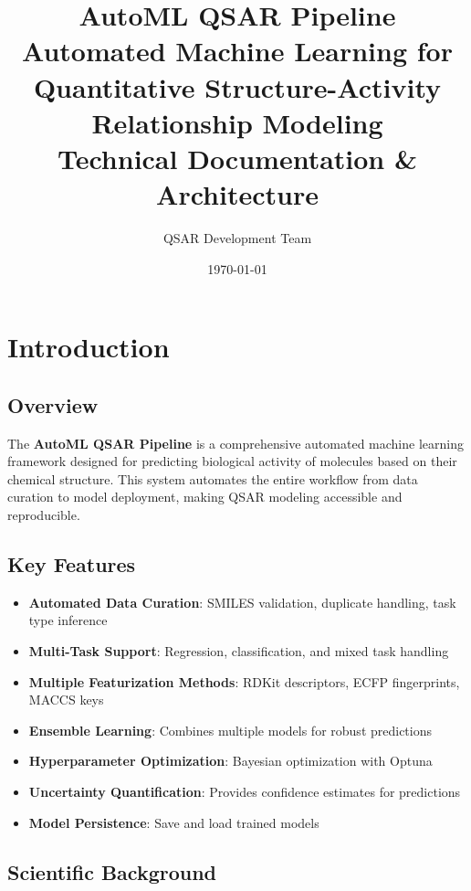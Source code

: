 \documentclass[11pt,a4paper]{article}
\title{
    \vspace{-2cm}
    \textbf{AutoML QSAR Pipeline}\\
    \large Automated Machine Learning for Quantitative Structure-Activity Relationship Modeling\\
    \vspace{0.5cm}
    \large Technical Documentation \& Architecture
}
\author{QSAR Development Team}
\date{\today}
\begin{document}
\maketitle
\tableofcontents
\newpage

\section{Introduction}

\subsection{Overview}

The \textbf{AutoML QSAR Pipeline} is a comprehensive automated machine learning framework designed for predicting biological activity of molecules based on their chemical structure. This system automates the entire workflow from data curation to model deployment, making QSAR modeling accessible and reproducible.

\subsection{Key Features}

\begin{itemize}[leftmargin=*]
    \item \textbf{Automated Data Curation}: SMILES validation, duplicate handling, task type inference
    \item \textbf{Multi-Task Support}: Regression, classification, and mixed task handling
    \item \textbf{Multiple Featurization Methods}: RDKit descriptors, ECFP fingerprints, MACCS keys
    \item \textbf{Ensemble Learning}: Combines multiple models for robust predictions
    \item \textbf{Hyperparameter Optimization}: Bayesian optimization with Optuna
    \item \textbf{Uncertainty Quantification}: Provides confidence estimates for predictions
    \item \textbf{Model Persistence}: Save and load trained models
\end{itemize}

\subsection{Scientific Background}
\end{document}
